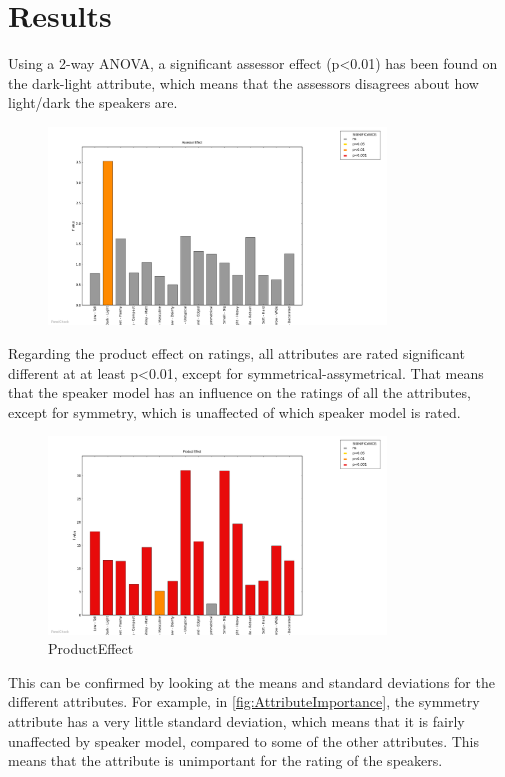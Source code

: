 \section*{Results}
\label{Results}


Using a 2-way ANOVA, a significant assessor effect (p<0.01) has been found on the dark-light attribute, which means that the assessors disagrees about how light/dark the speakers are.
\begin{figure}[H]
\centering
\includegraphics[width = 0.8\textwidth]{Figure/AssessorEffect.png} 
\caption{}
\label{fig:AssessorEffect}
\end{figure}
Regarding the product effect on ratings, all attributes are rated significant different at at least p<0.01, except for symmetrical-assymetrical. That means that the speaker model has an influence on the ratings of all the attributes, except for symmetry, which is unaffected of which speaker model is rated.
\begin{figure}[H]
\centering
\includegraphics[width = 0.8\textwidth]{Figure/ProductEffect.png} 
\caption{ProductEffect}
\label{fig:ProductEffect}
\end{figure}

This can be confirmed by looking at the means and standard deviations for the different attributes. For example, in \autoref{fig:AttributeImportance}, the symmetry attribute has a very little standard deviation, which means that it is fairly unaffected by speaker model, compared to some of the other attributes. This means that the attribute is unimportant for the rating of the speakers.

